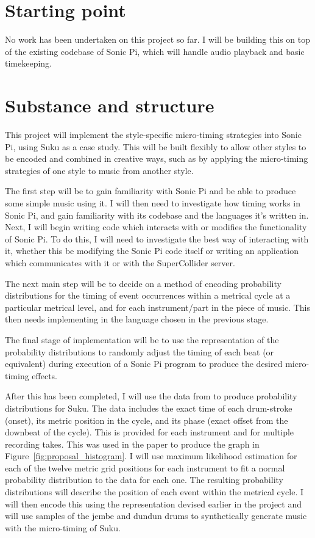 \documentclass[12pt,twoside,openright]{report}
\begin{document}
\begin{refsection}
\section*{Starting point}

No work has been undertaken on this project so far. I will be building this on
top of the existing codebase of Sonic Pi, which will handle audio playback and
basic timekeeping.



\section*{Substance and structure}

This project will implement the style-specific micro-timing strategies into
Sonic Pi, using Suku as a case study. This will be built flexibly to allow other
styles to be encoded and combined in creative ways, such as by applying the
micro-timing strategies of one style to music from another style.

The first step will be to gain familiarity with Sonic Pi and be able to produce
some simple music using it. I will then need to investigate how timing works in
Sonic Pi, and gain familiarity with its codebase and the languages it's written
in. Next, I will begin writing code which interacts with or modifies the
functionality of Sonic Pi. To do this, I will need to investigate the best way
of interacting with it, whether this be modifying the Sonic Pi code itself or
writing an application which communicates with it or with the SuperCollider
server.

The next main step will be to decide on a method of encoding probability
distributions for the timing of event occurrences within a metrical cycle at a
particular metrical level, and for each instrument/part in the piece of music.
This then needs implementing in the language chosen in the previous stage.

The final stage of implementation will be to use the representation of the
probability distributions to randomly adjust the timing of each beat (or
equivalent) during execution of a Sonic Pi program to produce the desired
micro-timing effects.

After this has been completed, I will use the data from \cite{jacoby2021} to produce
probability distributions for Suku. The data includes the exact time of each
drum-stroke (onset), its metric position in the cycle, and its phase (exact
offset from the downbeat of the cycle). This is provided for each instrument and
for multiple recording takes. This was used in the paper to produce the graph in
Figure~\ref{fig:proposal_histogram}. I will use maximum likelihood estimation for each of the twelve metric
grid positions for each instrument to fit a normal probability distribution to
the data for each one. The resulting probability distributions will describe the
position of each event within the metrical cycle. I will then encode this using
the representation devised earlier in the project and will use samples of the
jembe and dundun drums to synthetically generate music with the micro-timing of
Suku.


\end{refsection}
\end{document}
